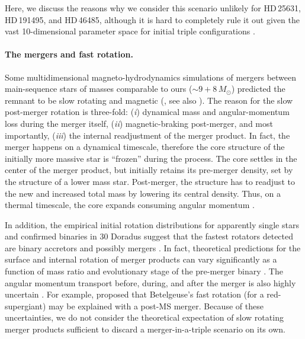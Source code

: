 \documentclass{aa}
\begin{document}
Here, we discuss the reasons why we consider this scenario unlikely
for HD\,25631, HD\,191495, and HD\,46485, although it is hard to
completely rule it out given the vast 10-dimensional parameter space
for initial triple configurations \citep[e.g.,][]{toonen:16}.

\paragraph{The mergers and fast rotation.}
Some multidimensional magneto-hydrodynamics simulations of mergers between
main-sequence stars of masses comparable to ours ($\sim 9+8\,M_\odot$)
predicted the remnant to be slow rotating and magnetic
(\citealt{schneider:16, schneider:19, schneider:20}, see also
\citealt{wang:20}). The reason for the slow post-merger rotation is
three-fold: (\emph{i}) dynamical mass and angular-momentum loss during
the merger itself, (\emph{ii}) magnetic-braking post-merger, and most
importantly, (\emph{iii}) the internal readjustment of the merger
product. In fact, the merger happens on a dynamical timescale,
therefore the core structure of the initially more massive star is
``frozen'' during the process. The core settles in the center of the
merger product, but initially retains its pre-merger density, set by
the structure of a lower mass star. Post-merger, the structure has to readjust to the new and increased total mass by lowering its
central density. Thus, on a thermal timescale, the core expands
consuming angular momentum \citep{schneider:19, schneider:20}.


In addition, the empirical initial rotation distributions for apparently
single stars \citep{vfts_2013_otype} and confirmed binaries
\citep{vfts_2015_otype} in 30 Doradus suggest that the fastest
rotators detected are binary accretors \citep[e.g.,][]{packet:81,
  blaauw:93, Renzo_2021} and possibly mergers
\citep[e.g.,][]{deMink_2013}. In fact, theoretical predictions for
the surface and internal rotation of merger products can vary
significantly as a function of mass ratio and evolutionary stage of
the pre-merger binary \citep{chatzopoulos:20, renzo:20c}. The
angular momentum transport before, during, and after the merger is also
highly uncertain \citep[e.g., see discussion in][]{spruit:99,
  spruit:02, fuller:19, denhartogh:20}. For example,
\cite{chatzopoulos:20} proposed that Betelgeuse's fast rotation (for a
red-supergiant) may be explained with a post-MS
merger. Because of these uncertainties, we do not consider the theoretical expectation of slow
rotating merger products sufficient to discard a
merger-in-a-triple scenario on its own.
\end{document}
